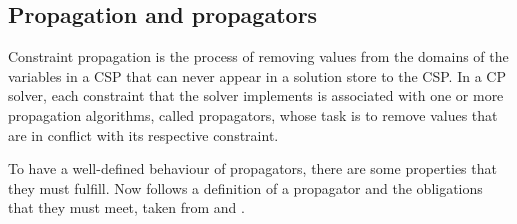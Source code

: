 \documentclass[a4paper,11pt]{article}
\numberwithin{equation}{section}
\begin{document}
\subsection{Propagation and propagators}

Constraint propagation is the process of removing values from the domains
of the variables in a CSP that can never appear in a solution store to the 
CSP. In a CP solver, each constraint that the solver implements is associated with 
one or more propagation algorithms, called propagators, whose task is to remove
values that are in conflict with its respective constraint.

To have a well-defined behaviour of propagators, there are some properties that
they must fulfill. Now follows a definition of a propagator and the obligations
that they must meet, taken from \cite{SchulteCarlsson:FDsys} and \cite{Gecode:MPG}.
\end{document}
